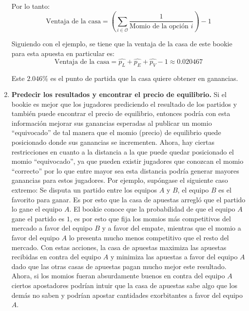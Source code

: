 \begin{enumerate}
 Por lo tanto:
 \[\text{Ventaja de la casa} =  \left(\sum_{i \in \mathcal{O}}{\frac{1}{\text{Momio de la opción } i}}\right) - 1\] 

 Siguiendo con el ejemplo, se tiene que la ventaja de la casa de este bookie para esta apuesta en particular es:
 \[\text{Ventaja de la casa} = \hat{p_L} + \hat{p_E} + \hat{p_V} - 1 \approx 0.020467\]

 Este $2.046\%$ es el punto de partida que la casa quiere obtener en ganancias. 


  \item \textbf{Predecir los resultados y encontrar el precio de equilibrio.} Si el bookie es mejor que los jugadores prediciendo el resultado de los partidos y también puede encontrar el precio de equilibrio, entonces podría con esta información mejorar sus ganancias esperadas al publicar un momio ``equivocado'' de tal manera que el momio (precio) de equilibrio quede posicionado donde sus ganancias se incrementen. Ahora, hay ciertas restricciones en cuanto a la distancia a la que puede quedar posicionado el momio ``equivocado'', ya que pueden existir jugadores que conozcan el momio ``correcto'' por lo que entre mayor sea esta distancia podría generar mayores ganancias para estos jugadores. Por ejemplo, supóngase el siguiente caso extremo: Se disputa un partido entre los equipos $A$ y $B$, el equipo $B$ es el favorito para ganar. Es por esto que la casa de apuestas arregló que el partido lo gane el equipo $A$. El bookie conoce que la probabilidad de que el equipo $A$ gane el partido es $1$, es por esto que fija los momios más competitivos del mercado a favor del equipo $B$ y a favor del empate, mientras que el momio a favor del equipo $A$ lo presenta mucho menos competitivo que el resto del mercado. Con estas acciones, la casa de apuestas maximiza las apuestas recibidas en contra del equipo $A$ y minimiza las apuestas a favor del equipo $A$ dado que las otras casas de apuestas pagan mucho mejor este resultado. Ahora, si los momios fueran absurdamente buenos en contra del equipo $A$ ciertos apostadores podrían intuir que la casa de apuestas sabe algo que los demás no saben y podrían apostar cantidades exorbitantes a favor del equipo $A$.

 \end{enumerate}


